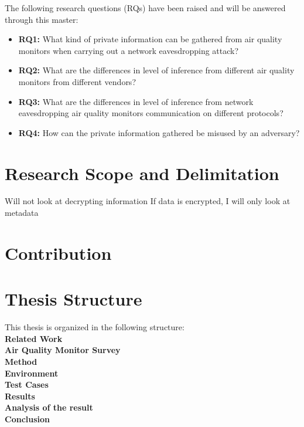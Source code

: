 The following research questions (RQs) have been raised and will be answered through this master:
\begin{itemize}
    \item 
    \textbf{RQ1:} What kind of private information can be gathered from air quality monitors when carrying out a network eavesdropping attack?\\
    \item 
    \textbf{RQ2:} What are the differences in level of inference from different air quality monitors from different vendors?\\
    \item
    \textbf{RQ3:} What are the differences in level of inference from network eavesdropping air quality monitors communication on different protocols?\\
    \item 
    \textbf{RQ4:} How can the private information gathered be misused by an adversary?\\
\end{itemize}

\section*{Research Scope and Delimitation}
Will not look at decrypting information
If data is encrypted, I will only look at metadata

\section*{Contribution}

\section*{Thesis Structure}
This thesis is organized in the following structure:\\
\textbf{Related Work}
\\
\textbf{Air Quality Monitor Survey}
\\
\textbf{Method}
\\
\textbf{Environment}
\\
\textbf{Test Cases}
\\
\textbf{Results}
\\
\textbf{Analysis of the result}
\\
\textbf{Conclusion}
\\
